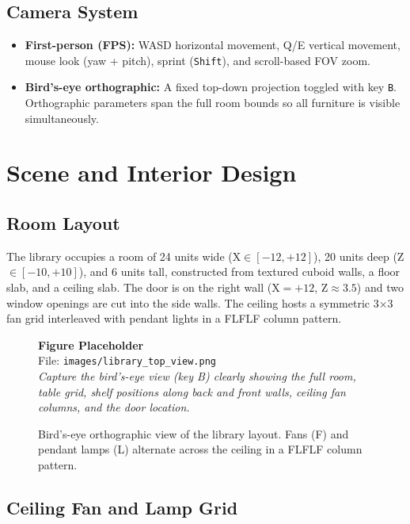 \documentclass[12pt, a4paper]{article}
\newcommand{\imgph}[2]{%
    \begin{mdframed}[backgroundcolor=lightblue!60, linecolor=sectionblue,
                     linewidth=1pt, roundcorner=4pt, innertopmargin=8pt,
                     innerbottommargin=8pt]
        \centering
        {\bfseries\color{sectionblue} Figure Placeholder}\\[4pt]
        File: \texttt{#1}\\[3pt]
        {\small\itshape #2}
    \end{mdframed}%
}
\begin{document}
\subsection{Camera System}

\begin{itemize}[leftmargin=1.5em]
    \item \textbf{First-person (FPS):} WASD horizontal movement, Q/E vertical movement, mouse look (yaw + pitch), sprint (\texttt{Shift}), and scroll-based FOV zoom.
    \item \textbf{Bird's-eye orthographic:} A fixed top-down projection toggled with key \texttt{B}. Orthographic parameters span the full room bounds so all furniture is visible simultaneously.
\end{itemize}

\section{Scene and Interior Design}

\subsection{Room Layout}

The library occupies a room of 24 units wide (X$\in[-12,+12]$), 20 units deep (Z$\in[-10,+10]$), and 6 units tall, constructed from textured cuboid walls, a floor slab, and a ceiling slab. The door is on the right wall (X$=+12$, Z$\approx 3.5$) and two window openings are cut into the side walls. The ceiling hosts a symmetric 3$\times$3 fan grid interleaved with pendant lights in a FLFLF column pattern.

\begin{figure}[H]
    \centering
    \imgph{images/library_top_view.png}{%
        Capture the bird's-eye view (key B) clearly showing the full room, table grid,
        shelf positions along back and front walls, ceiling fan columns, and the door location.}
    \caption{Bird's-eye orthographic view of the library layout. Fans (F) and pendant lamps (L) alternate across the ceiling in a FLFLF column pattern.}
    \label{fig:layout}
\end{figure}

\subsection{Ceiling Fan and Lamp Grid}
\end{document}

